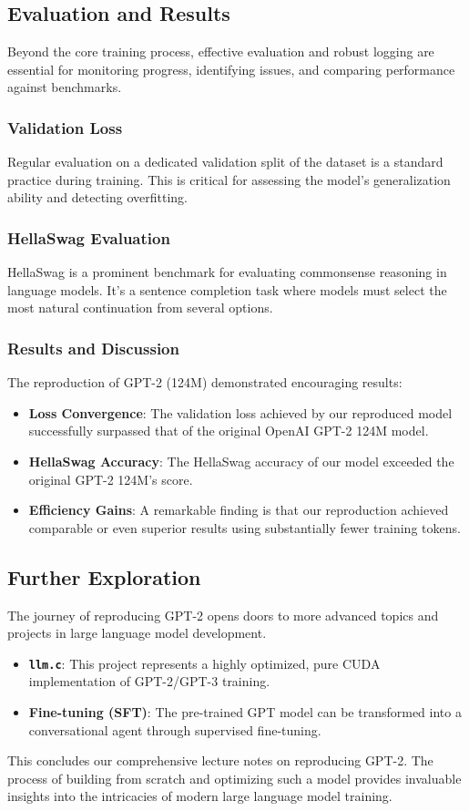 \subsection{Evaluation and Results}
Beyond the core training process, effective evaluation and robust logging are essential for monitoring progress, identifying issues, and comparing performance against benchmarks.

\subsubsection{Validation Loss}
Regular evaluation on a dedicated validation split of the dataset is a standard practice during training. This is critical for assessing the model's generalization ability and detecting overfitting.

\subsubsection{HellaSwag Evaluation}
HellaSwag is a prominent benchmark for evaluating commonsense reasoning in language models. It's a sentence completion task where models must select the most natural continuation from several options.

\subsubsection{Results and Discussion}
The reproduction of GPT-2 (124M) demonstrated encouraging results:
\begin{itemize}
    \item \textbf{Loss Convergence}: The validation loss achieved by our reproduced model successfully surpassed that of the original OpenAI GPT-2 124M model.
    \item \textbf{HellaSwag Accuracy}: The HellaSwag accuracy of our model exceeded the original GPT-2 124M's score.
    \item \textbf{Efficiency Gains}: A remarkable finding is that our reproduction achieved comparable or even superior results using substantially fewer training tokens.
\end{itemize}

\subsection{Further Exploration}
The journey of reproducing GPT-2 opens doors to more advanced topics and projects in large language model development.

\begin{itemize}
    \item \textbf{\texttt{llm.c}}: This project represents a highly optimized, pure CUDA implementation of GPT-2/GPT-3 training.
    \item \textbf{Fine-tuning (SFT)}: The pre-trained GPT model can be transformed into a conversational agent through supervised fine-tuning.
\end{itemize}

This concludes our comprehensive lecture notes on reproducing GPT-2. The process of building from scratch and optimizing such a model provides invaluable insights into the intricacies of modern large language model training.
